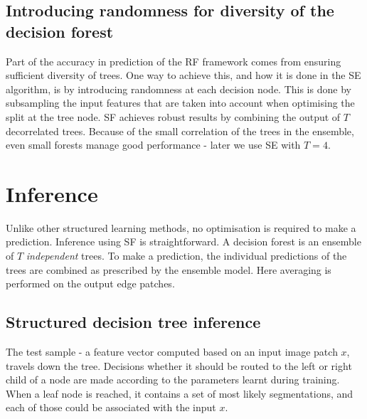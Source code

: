 \subsection{Introducing randomness for diversity of the decision forest}
Part of the accuracy in prediction of the RF framework comes from ensuring sufficient diversity of trees. One way to achieve this, and how it is done in the SE algorithm, is by introducing randomness at each decision node. This is done by subsampling the input features that are taken into account when optimising the split at the tree node. SF achieves robust results by combining the output of $T$ decorrelated trees. Because of the small correlation of the trees in the ensemble, even small forests manage good performance - later we use SE with $T=4$.

\section{Inference}
Unlike other structured learning methods, no optimisation is required to make a prediction. Inference using SF is straightforward. A decision forest is an ensemble of $T$ \textit{independent} trees. To make a prediction, the individual predictions of the trees are combined as prescribed by the ensemble model. Here averaging is performed on the output edge patches.

\subsection{Structured decision tree inference}
The test sample - a feature vector computed based on an input image patch $x$, travels down the tree. Decisions whether it should be routed to the left or right child of a node are made according to the parameters learnt during training. When a leaf node is reached, it contains a set of most likely segmentations, and each of those could be associated with the input $x$.

